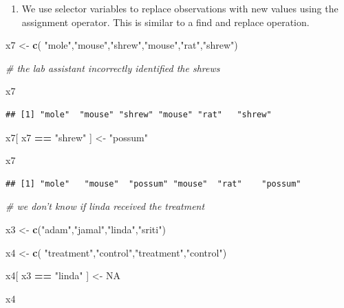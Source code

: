 \documentclass[]{book}
\newenvironment{Shaded}{\begin{snugshade}}{\end{snugshade}}
\newcommand{\CommentTok}[1]{\textcolor[rgb]{0.56,0.35,0.01}{\textit{#1}}}
\newcommand{\KeywordTok}[1]{\textcolor[rgb]{0.13,0.29,0.53}{\textbf{#1}}}
\newcommand{\NormalTok}[1]{#1}
\newcommand{\OperatorTok}[1]{\textcolor[rgb]{0.81,0.36,0.00}{\textbf{#1}}}
\newcommand{\OtherTok}[1]{\textcolor[rgb]{0.56,0.35,0.01}{#1}}
\newcommand{\StringTok}[1]{\textcolor[rgb]{0.31,0.60,0.02}{#1}}
\providecommand{\tightlist}{%
  \setlength{\itemsep}{0pt}\setlength{\parskip}{0pt}}
\theoremstyle{definition}
\theoremstyle{definition}
\theoremstyle{definition}
\theoremstyle{remark}
\begin{document}
\begin{enumerate}
\def\labelenumi{(\arabic{enumi})}
\setcounter{enumi}{2}
\tightlist
\item
  We use selector variables to replace observations with new values
  using the assignment operator. This is similar to a find and replace
  operation.
\end{enumerate}

\begin{Shaded}
\begin{Highlighting}[]
\NormalTok{x7 <-}\StringTok{ }\KeywordTok{c}\NormalTok{( }\StringTok{"mole"}\NormalTok{,}\StringTok{"mouse"}\NormalTok{,}\StringTok{"shrew"}\NormalTok{,}\StringTok{"mouse"}\NormalTok{,}\StringTok{"rat"}\NormalTok{,}\StringTok{"shrew"}\NormalTok{)}

\CommentTok{# the lab assistant incorrectly identified the shrews}

\NormalTok{x7}
\end{Highlighting}
\end{Shaded}

\begin{verbatim}
## [1] "mole"  "mouse" "shrew" "mouse" "rat"   "shrew"
\end{verbatim}

\begin{Shaded}
\begin{Highlighting}[]
\NormalTok{x7[ x7 }\OperatorTok{==}\StringTok{ "shrew"}\NormalTok{ ] <-}\StringTok{ "possum"}

\NormalTok{x7}
\end{Highlighting}
\end{Shaded}

\begin{verbatim}
## [1] "mole"   "mouse"  "possum" "mouse"  "rat"    "possum"
\end{verbatim}

\begin{Shaded}
\begin{Highlighting}[]
\CommentTok{# we don't know if linda received the treatment}

\NormalTok{x3 <-}\StringTok{ }\KeywordTok{c}\NormalTok{(}\StringTok{"adam"}\NormalTok{,}\StringTok{"jamal"}\NormalTok{,}\StringTok{"linda"}\NormalTok{,}\StringTok{"sriti"}\NormalTok{)}

\NormalTok{x4 <-}\StringTok{ }\KeywordTok{c}\NormalTok{( }\StringTok{"treatment"}\NormalTok{,}\StringTok{"control"}\NormalTok{,}\StringTok{"treatment"}\NormalTok{,}\StringTok{"control"}\NormalTok{)}

\NormalTok{x4[ x3 }\OperatorTok{==}\StringTok{ "linda"}\NormalTok{ ] <-}\StringTok{ }\OtherTok{NA}

\NormalTok{x4}
\end{Highlighting}
\end{Shaded}
\end{document}
